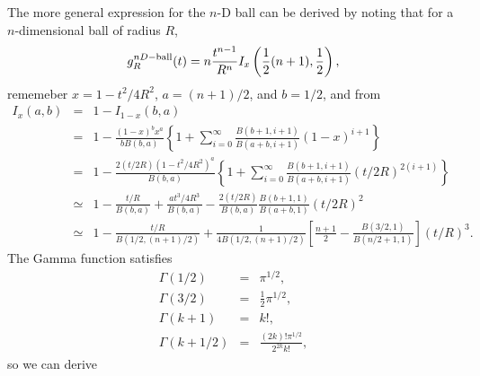 \documentclass{article}
\begin{document}


The more general expression for the $n$-D ball can be derived by
noting that for a $n$-dimensional ball of radius $R$,
\begin{equation}
 g^{nD-{\rm ball}}_R(t) = n \frac{t^{n-1}}{R^n} I_x\left( 
  \frac{1}{2} (n+1), \frac{1}{2}
                      \right),
\end{equation}
rememeber $x = 1 - t^2/4R^2$, $a=(n+1)/2$, and $b=1/2$, and from
\cite[26.5.4]{Abramowitz_and_Stegun}
\begin{eqnarray}
  \label{eq:Ix}
  I_x(a,b) 
 & = & 1 - I_{1-x}(b,a)
                    \nonumber \\
 & = & 1 - \frac{(1-x)^b x^a}{b B(b,a)}  \left\{ 
               1 +
               \sum_{i=0}^{\infty} \frac{B(b+1,i+1)}{B(a+b,i+1)} (1-x)^{i+1}
           \right\} 
               \nonumber \\
 & = & 1 - \frac{2 (t/2R) (1 - t^2/4R^2)^a}{B(b,a)}  \left\{ 
               1 +
               \sum_{i=0}^{\infty} \frac{B(b+1,i+1)}{B(a+b,i+1)} (t/2R)^{2(i+1)}
           \right\} 
               \nonumber \\
 & \simeq & 1 - \frac{t/R}{B(b,a)} 
               + \frac{a t^3/4R^3 }{B(b,a)} 
               - \frac{2 (t/2R)}{B(b,a)} \frac{B(b+1,1)}{B(a+b,1)} (t/2R)^{2}
               \nonumber \\
 & \simeq & 1 - \frac{t/R}{B(1/2,(n+1)/2)} 
               + \frac{1}{4 B(1/2,(n+1)/2)} 
                   \left[ \frac{n+1}{2}
                          -\frac{B(3/2,1)}{B(n/2+1,1)} \right] (t/R)^{3}.
\end{eqnarray}
The Gamma function satisfies\cite[6.1.12]{Abramowitz_and_Stegun}
\begin{eqnarray}
  \label{eq:gamma}
  \Gamma(1/2) & = & \pi^{1/2}, \\
  \Gamma(3/2) & = & \frac{1}{2} \pi^{1/2}, \\
  \Gamma(k+1) & = & k!, \\
  \Gamma(k+1/2) & = & \frac{(2k)! \pi^{1/2}}{2^{2k} k!},
\end{eqnarray}
so we can derive
\end{document}
